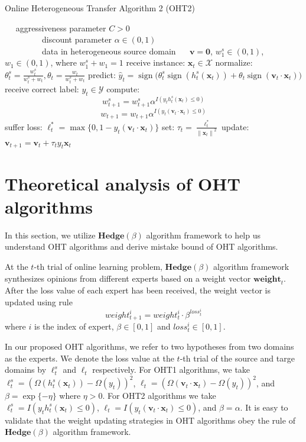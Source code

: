 \documentclass{article} %
\theoremstyle{remark}
\theoremstyle{definition}
\DeclareMathOperator{\sign}{sign}
\begin{document}
\begin{algorithm}
\begin{algorithmic}[1]
\caption{Online Heterogeneous Transfer Algorithm 2 (OHT2)}
\REQUIRE ~~
aggressiveness parameter $C>0$\\ 
~~~~~~~~~discount parameter $\alpha \in (0,1)$\\ 
~~~~~~~~~data in heterogeneous source domain
\ENSURE ~~
$\mathbf{v} = \mathbf{0}$, $w_{1}^{s} \in (0,1)$, $w_{1} \in (0,1)$, where $w_{1}^{s} + w_1 = 1$
\STATE 
  receive instance: $\mathbf{x}_t \in \mathcal{X}$
\STATE
  normalize: $\theta_{t}^{s} = \frac{w_{t}^{s}}{w_{t}^{s}+w_t}, \theta_{t} = \frac{w_{t}}{w_{t}^{s}+w_t}$
\STATE
  predict: $\hat{y}_t = \sign \big( \theta_{t}^{s} \sign (h_{t}^{s}(\mathbf{x}_t)) + \theta_{t} \sign (\mathbf{v}_t \cdot \mathbf{x}_t) \big)$
\STATE
  receive correct label: $y_t \in \mathcal{Y}$
\STATE
  compute: 
    $$w_{t+1}^{s} = w_{t+1}^{s} \alpha ^ {I(y_t h_{t}^{s}(\mathbf{x}_t) \leq 0)}  $$
    $$w_{t+1} = w_{t+1} \alpha ^ {I(y_t (\mathbf{v}_t \cdot \mathbf{x}_t) \leq 0)}  $$
\STATE
  suffer loss: $\ell_{t}^{*} = \max \{0, 1-y_t(\mathbf{v}_t \cdot \mathbf{x}_t)\}$
\STATE
  set: $\tau_t = \frac{\ell_{t}^{*}}{{\|\mathbf{x}_t\|}^2}$
\STATE
  update: $ \mathbf{v}_{t+1} = \mathbf{v}_t + \tau_t y_t \mathbf{x}_t $
\ENDFOR
\end{algorithmic}
\end{algorithm}


\section{Theoretical analysis of OHT algorithms}
In this section, we utilize $\mathbf{Hedge}(\beta)$ algorithm framework to help us understand OHT algorithms and derive mistake bound of OHT algorithms.

At the $t$-th trial of online learning problem, $\mathbf{Hedge}(\beta)$ algorithm framework synthesizes opinions from different experts based on a weight vector $\mathbf{weight}_t$.
After the loss value of each expert has been received, the weight vector is updated using rule
$$ weight_{t+1}^{i} = weight_{t}^{i} \cdot \beta^{loss_{t}^{i}} $$
where $i$ is the index of expert, $\beta \in [0,1]$ and $loss_{t}^{i} \in [0,1]$.

In our proposed OHT algorithms, we refer to two hypotheses from two domains as the experts.
We denote the loss value at the $t$-th trial of the source and targe domains by $\ell_{t}^{s}$ and $\ell_t$ respectively.
For OHT1 algorithms, we take $\ell_{t}^{s} = (\varOmega(h_{t}^{s}(\mathbf{x}_t)) - \varOmega(y_t)) ^ 2$, $\ell_t = (\varOmega(\mathbf{v}_t \cdot \mathbf{x}_t) - \varOmega(y_t)) ^ 2$, and $\beta = \exp\{-\eta\}$ where $\eta > 0$.
For OHT2 algorithms we take $\ell_{t}^{s} = I(y_t h_{t}^{s}(\mathbf{x}_t) \leq 0)$, $\ell_t = I(y_t (\mathbf{v}_t \cdot \mathbf{x}_t) \leq 0)$, and $\beta = \alpha$.
It is easy to validate that the weight updating strategies in OHT algorithms obey the rule of $\mathbf{Hedge}(\beta)$ algorithm framework.
\end{document}
